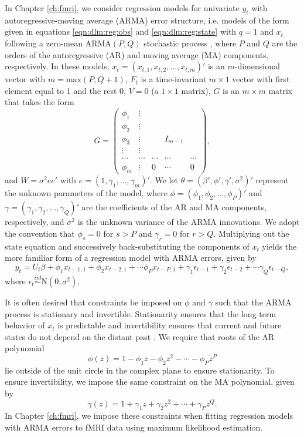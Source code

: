 In Chapter \ref{ch:fmri}, we consider regression models for univariate $y_t$ with autoregressive-moving average (ARMA) error structure, i.e. models of the form given in equations \eqref{eqn:dlm:reg:obs} and \eqref{eqn:dlm:reg:state} with $q = 1$ and $x_t$ following a zero-mean $\mbox{ARMA}(P, Q)$ stochastic process \citep{shum:stof:2006:timeseries}, where $P$ and $Q$ are the orders of the autoregressive (AR) and moving average (MA) components, respectively. In these models, $x_t = (x_{t,1} ,x_{t,2}, \ldots, x_{t,m})'$ is an $m$-dimensional vector with $m = \mbox{max}(P,Q+1)$, $F_t$ is a time-invariant $m \times 1$ vector with first element equal to 1 and the rest 0, $V = 0$ (a $1 \times 1$ matrix), $G$ is an $m \times m$ matrix that takes the form
\begin{equation}
G = \left(
 \begin{array}{ccccc}
 \phi_1 & \vdots \\
 \phi_2 & \vdots \\
 \phi_3 & \vdots && I_{m-1} \\
 \vdots & \vdots \\
 \cdots & \cdots & \cdots & \cdots & \cdots \\
 \phi_m &\vdots & 0 & \cdots & 0
 \end{array}
\right), \label{eqn:dlm:ar:G}
\end{equation}
and $W = \sigma^2ee'$ with $e = (1, \gamma_1, \ldots, \gamma_m)'$. We let $\theta = (\beta', \phi', \gamma', \sigma^2)'$ represent the unknown parameters of the model, where $\phi = (\phi_1,\phi_2,\ldots,\phi_P)'$ and $\gamma = (\gamma_1,\gamma_2,\ldots,\gamma_Q)'$ are the coefficients of the AR and MA components, respectively, and $\sigma^2$ is the unknown variance of the ARMA innovations. We adopt the convention that $\phi_s = 0$ for $s > P$ and $\gamma_r = 0$ for $r > Q$. Multiplying out the state equation and successively back-substituting the components of $x_t$ \cite[see Sec 3.2.5,][]{petris:camp:2009:dynamic} yields the more familiar form of a regression model with ARMA errors, given by
\begin{equation}
y_t = U_t\beta + \phi_1x_{t-1,1} + \phi_2x_{t-2,1} + \cdots \phi_Px_{t-P,1} + \gamma_1\epsilon_{t-1} + \gamma_2\epsilon_{t-2} + \cdots \gamma_Q\epsilon_{t-Q}, \label{eqn:arma}
\end{equation}
where $\epsilon_t \stackrel{iid}{\sim} \mbox{N}(0,\sigma^2)$.

It is often desired that constraints be imposed on $\phi$ and $\gamma$ such that the ARMA process is stationary and invertible. Stationarity ensures that the long term behavior of $x_t$ is predictable and invertibility ensures that current and future states do not depend on the distant past \citep{shum:stof:2006:timeseries}. We require that roots of the AR polynomial
\[\phi(z) = 1 - \phi_1z - \phi_2z^2 - \cdots - \phi_Pz^P\]
lie outside of the unit circle in the complex plane to ensure stationarity. To ensure invertibility, we impose the same constraint on the MA polynomial, given by
\[\gamma(z) = 1 + \gamma_1z + \gamma_2z^2 + \cdots + \gamma_Pz^Q.\]
In Chapter \ref{ch:fmri}, we impose these constraints when fitting regression models with ARMA errors to fMRI data using maximum likelihood estimation.

